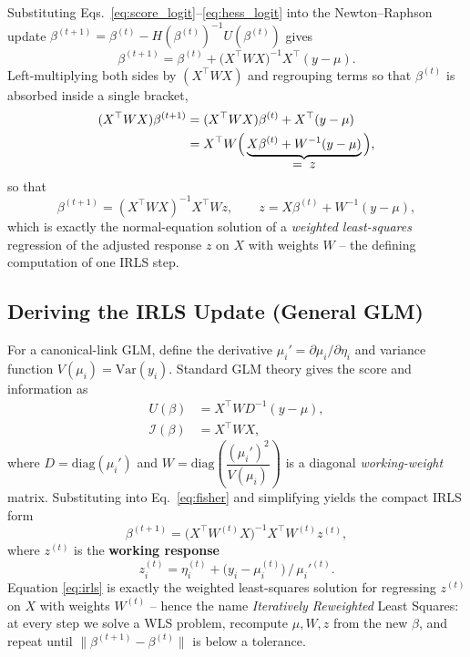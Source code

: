 \documentclass[a4paper,11pt]{article}
\begin{document}
Substituting Eqs.~\eqref{eq:score_logit}--\eqref{eq:hess_logit} into the Newton--Raphson update $\beta^{(t+1)}=\beta^{(t)}-H(\beta^{(t)})^{-1}U(\beta^{(t)})$ gives
\begin{equation}
\beta^{(t+1)} = \beta^{(t)} + \big(X^\top W X\big)^{-1} X^\top (y-\mu).
\end{equation}
Left-multiplying both sides by $(X^\top W X)$ and regrouping terms so that $\beta^{(t)}$ is absorbed inside a single bracket,
\begin{align}
(X^\top W X)\beta^{(t+1)} &= (X^\top W X)\beta^{(t)} + X^\top(y-\mu) \notag\\
&= X^\top W\Big(\underbrace{X\beta^{(t)} + W^{-1}(y-\mu)}_{\textstyle =\; z}\Big),
\end{align}
so that
\begin{equation}
\beta^{(t+1)} = (X^\top W X)^{-1} X^\top W z, \qquad z = X\beta^{(t)} + W^{-1}(y-\mu),
\label{eq:irls_logit_explicit}
\end{equation}
which is exactly the normal-equation solution of a \emph{weighted least-squares} regression of the adjusted response $z$ on $X$ with weights $W$ -- the defining computation of one IRLS step.

\subsection{Deriving the IRLS Update (General GLM)}
For a canonical-link GLM, define the derivative $\mu_i' = \partial \mu_i / \partial \eta_i$ and variance function $V(\mu_i) = \mathrm{Var}(y_i)$. Standard GLM theory gives the score and information as
\begin{align}
U(\beta) &= X^\top W D^{-1}(y - \mu), \\
\mathcal{I}(\beta) &= X^\top W X,
\end{align}
where $D = \mathrm{diag}(\mu_i')$ and $W = \mathrm{diag}\!\left(\dfrac{(\mu_i')^2}{V(\mu_i)}\right)$ is a diagonal \emph{working-weight} matrix. Substituting into Eq.~\eqref{eq:fisher} and simplifying yields the compact IRLS form
\begin{equation}
\beta^{(t+1)} = \big(X^\top W^{(t)} X\big)^{-1} X^\top W^{(t)} z^{(t)},
\label{eq:irls}
\end{equation}
where $z^{(t)}$ is the \textbf{working response}
\begin{equation}
z_i^{(t)} = \eta_i^{(t)} + \big(y_i - \mu_i^{(t)}\big)\,\big/\, \mu_i'^{(t)}.
\end{equation}
Equation \eqref{eq:irls} is exactly the weighted least-squares solution for regressing $z^{(t)}$ on $X$ with weights $W^{(t)}$ -- hence the name \emph{Iteratively Reweighted} Least Squares: at every step we solve a WLS problem, recompute $\mu, W, z$ from the new $\beta$, and repeat until $\|\beta^{(t+1)}-\beta^{(t)}\|$ is below a tolerance.
\end{document}
